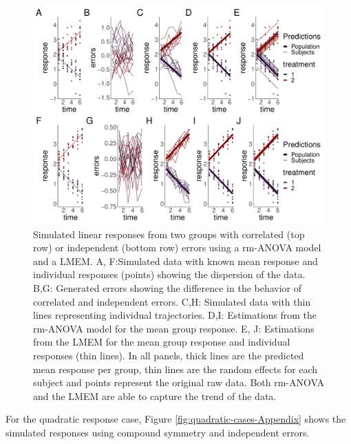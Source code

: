 \documentclass[
]{article}
\begin{document}
\begin{figure}[H]
\includegraphics{00-Full_document_files/figure-latex/linear-cases-Appendix-1} \caption{Simulated linear responses from two groups with correlated (top row) or independent (bottom row) errors using a rm-ANOVA model and a LMEM. A, F:Simulated data with known mean response and individual responses (points) showing the dispersion of the data. B,G: Generated errors showing the difference in the behavior of correlated and independent errors. C,H: Simulated data with thin lines representing individual trajectories. D,I: Estimations from the rm-ANOVA model for the mean group response. E, J: Estimations from the LMEM for the mean group response and individual responses (thin lines). In all panels, thick lines are the predicted mean response per group, thin lines are the random effects for each subject and points represent the original raw data. Both rm-ANOVA and the LMEM are able to capture the trend of the data.}\label{fig:linear-cases-Appendix}
\end{figure}

For the quadratic response case, Figure \ref{fig:quadratic-cases-Appendix} shows the simulated responses using compound symmetry and independent errors.
\end{document}
